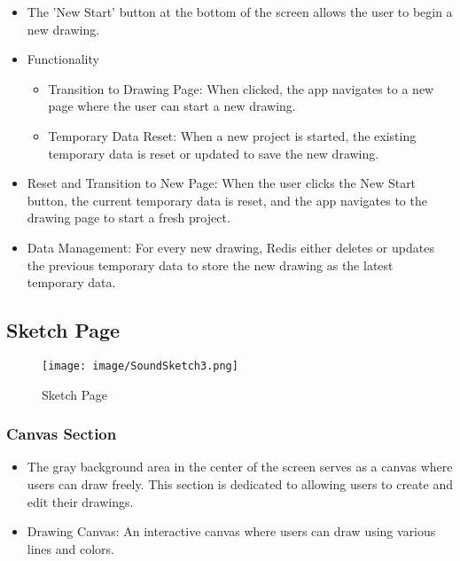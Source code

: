 \documentclass[conference]{IEEEtran}
\begin{document}
\begin{itemize}
    \item The 'New Start' button at the bottom of the screen allows the user to begin a new drawing.\\
    \item Functionality 
\begin{itemize}
    \item Transition to Drawing Page: When clicked, the app navigates to a new page where the user can start a new drawing.\\
    \item Temporary Data Reset: When a new project is started, the existing temporary data is reset or updated to save the new drawing.\\

\end{itemize}
\end{itemize}    
\begin{itemize}
    \item Reset and Transition to New Page: When the user clicks the New Start button, the current temporary data is reset, and the app navigates to the drawing page to start a fresh project.\\
    \item Data Management: For every new drawing, Redis either deletes or updates the previous temporary data to store the new drawing as the latest temporary data.\\
\end{itemize}

\subsection{Sketch Page }

\begin{figure}[h!]
    \centering
    \texttt{[image: image/SoundSketch3.png]}
    \caption{Sketch Page}
    \label{fig:enter-label}
\end{figure}

\subsubsection{Canvas Section}
\begin{itemize}
    \item The gray background area in the center of the screen serves as a canvas where users can draw freely. This section is dedicated to allowing users to create and edit their drawings.\\
    \item Drawing Canvas: An interactive canvas where users can draw using various lines and colors.\\
\end{itemize}
\end{document}
